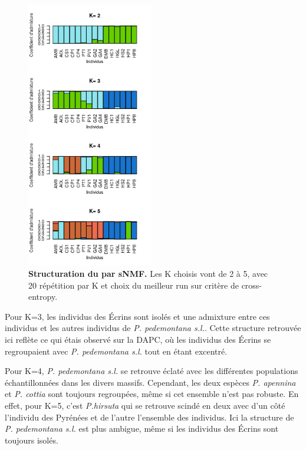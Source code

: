 \begin{figure}
	\vspace{-40pt}
	\begin{center}
	\includegraphics[width=0.49\textwidth]{fig/structure_hirsuta.png}
	\end{center}
	\caption{\textbf{Structuration du  par sNMF.} Les K choisis vont de 2 à 5, avec 20 répétition par K et choix du meilleur run sur critère de cross-entropy.}
    \label{structure}
    \vspace{-30pt}
\end{figure}

Pour K=3, les individus des Écrins sont isolés et une admixture entre ces individus et les autres individus de \textit{P. pedemontana s.l.}. Cette structure retrouvée ici reflète ce qui étais observé sur la DAPC, où les individus des Écrins se regroupaient avec \textit{P. pedemontana s.l.} tout en étant excentré.

Pour K=4, \textit{P. pedemontana s.l.} se retrouve éclaté avec les différentes populations échantillonnées dans les divers massifs. Cependant, les deux espèces \textit{P. apennina} et \textit{P. cottia} sont toujours regroupées, même si cet ensemble n'est pas robuste. En effet, pour K=5, c'est \textit{P.hirsuta} qui se retrouve scindé en deux avec d'un côté l'individu des Pyrénées et de l'autre l'ensemble des individus. Ici la structure de \textit{P. pedemontana s.l.} est plus ambigue, même si les individus des Écrins sont toujours isolés.

